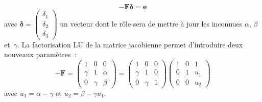 \documentclass[11pt]{amsart}
\newcommand{\mb}[1]{\mathbf{#1}}
\newcommand{\vb}[1]{\mathbf{#1}}
\begin{document}
$$-\mb{F}\vb{\delta} = \vb{e}$$
avec
$\vb{\delta} = \begin{pmatrix} \delta_1 \\ \delta_2 \\ \delta_3 \end{pmatrix}$ un vecteur dont le r\^ole sera de mettre \`a jour les inconnues $\alpha$, $\beta$ et~$\gamma$.
La factorisation LU de la matrice jacobienne permet d'introduire deux nouveaux param\`etres~:
$$-\mb{F} = \begin{pmatrix} 1 & 0 & 0 \\ \gamma & 1 & \alpha \\ 0 & \gamma & \beta \end{pmatrix} = \begin{pmatrix} 1 & 0 & 0 \\ \gamma & 1 & 0  \\ 0 & \gamma & 1 \end{pmatrix}\begin{pmatrix}1 & 0 & 1 \\ 0 & 1 & u_1 \\ 0 & 0 & u_2\end{pmatrix}$$
avec $u_1=\alpha-\gamma$ et $u_2=\beta - \gamma{}u_1$.\\
\end{document}
